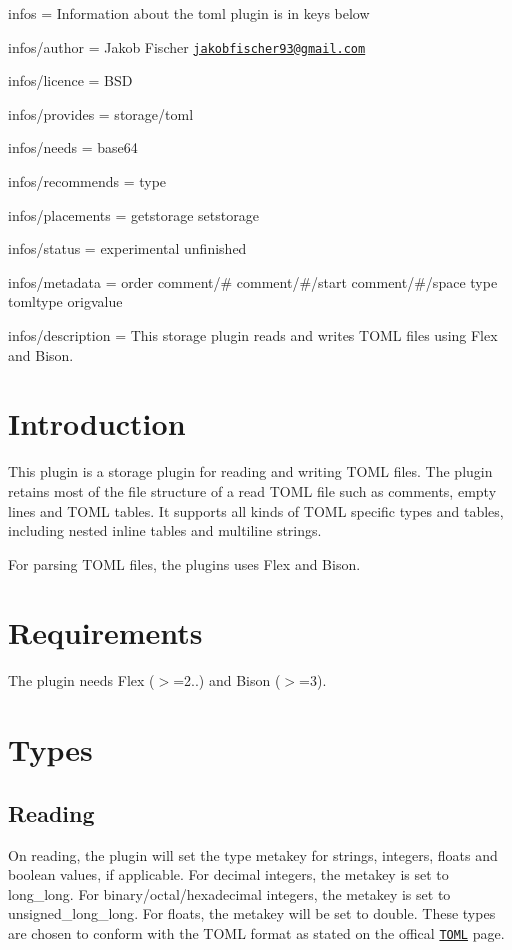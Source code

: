 
\begin{DoxyItemize}
\item infos = Information about the toml plugin is in keys below
\item infos/author = Jakob Fischer \href{mailto:jakobfischer93@gmail.com}{\tt jakobfischer93@gmail.\+com}
\item infos/licence = B\+SD
\item infos/provides = storage/toml
\item infos/needs = base64
\item infos/recommends = type
\item infos/placements = getstorage setstorage
\item infos/status = experimental unfinished
\item infos/metadata = order comment/\# comment/\#/start comment/\#/space type tomltype origvalue
\item infos/description = This storage plugin reads and writes T\+O\+ML files using Flex and Bison.
\end{DoxyItemize}\hypertarget{autotoc_md693_src_plugins_toml_README_md}{}\section{Introduction}\label{autotoc_md693_src_plugins_toml_README_md}
This plugin is a storage plugin for reading and writing T\+O\+ML files. The plugin retains most of the file structure of a read T\+O\+ML file such as comments, empty lines and T\+O\+ML tables. It supports all kinds of T\+O\+ML specific types and tables, including nested inline tables and multiline strings.

For parsing T\+O\+ML files, the plugins uses Flex and Bison.\hypertarget{autotoc_md693_autotoc_md694}{}\section{Requirements}\label{autotoc_md693_autotoc_md694}
The plugin needs Flex ($>$=2..) and Bison ($>$=3).\hypertarget{autotoc_md693_autotoc_md695}{}\section{Types}\label{autotoc_md693_autotoc_md695}
\hypertarget{autotoc_md693_autotoc_md696}{}\subsection{Reading}\label{autotoc_md693_autotoc_md696}
On reading, the plugin will set the {\ttfamily type} metakey for strings, integers, floats and boolean values, if applicable. For decimal integers, the metakey is set to {\ttfamily long\+\_\+long}. For binary/octal/hexadecimal integers, the metakey is set to {\ttfamily unsigned\+\_\+long\+\_\+long}. For floats, the metakey will be set to {\ttfamily double}. These types are chosen to conform with the T\+O\+ML format as stated on the offical \href{https://toml.io/en/v1.0.0-rc.1}{\tt T\+O\+ML} page.

